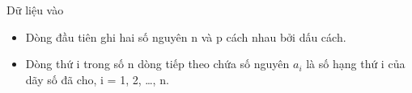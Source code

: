Dữ liệu vào  
\begin{itemize}
	\item     Dòng đầu tiên ghi hai số nguyên n và p cách nhau bởi dấu cách.   
	\item     Dòng thứ i trong số n dòng tiếp theo chứa số nguyên $a_{i}$    là số hạng thứ i của dãy số đã  cho, i = 1, 2, …, n.   
\end{itemize}